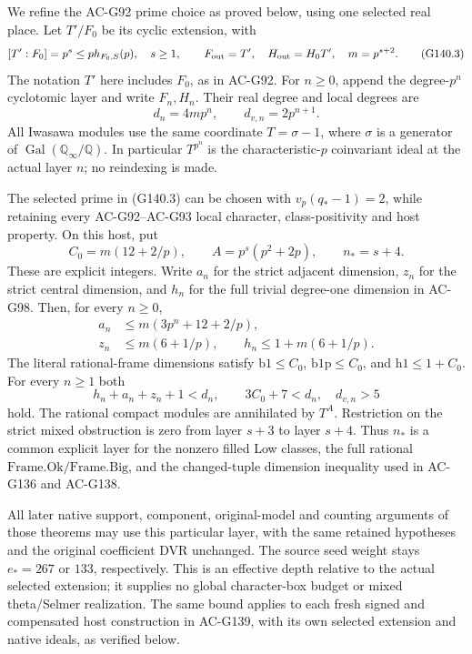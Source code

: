 We refine the AC-G92 prime choice as proved below, using one selected
real place.  Let $T'/F_0$ be its cyclic extension, with
\[
 [T':F_0]=p^s\le p h_{F_0,S}(p),\quad s\ge1,\qquad
 F_{\rm out}=T',\quad H_{\rm out}=H_0T',\quad m=p^{s+2}.
 \tag{G140.3}
\]
The notation $T'$ here includes $F_0$, as in AC-G92.
For $n\ge0$, append the degree-$p^n$ cyclotomic layer and write
$F_n,H_n$.  Their real degree and local degrees are
\[
 d_n=4mp^n,\qquad d_{v,n}=2p^{n+1}.
 \tag{G140.4}
\]
All Iwasawa modules use the same coordinate $T=\sigma-1$, where
$\sigma$ is a generator of $\operatorname{Gal}(\mathbb Q_\infty/
\mathbb Q)$.  In particular $T^{p^n}$ is the characteristic-$p$
coinvariant ideal at the actual layer $n$; no reindexing is made.

\begin{theorem}
\label{AC-G140}
The selected prime in (G140.3) can be chosen with
$v_p(q_*-1)=2$, while retaining every AC-G92--AC-G93 local character,
class-positivity and host property.  On this host, put
\[
 C_0=m(12+2/p),\qquad A=p^s(p^2+2p),\qquad n_*=s+4.
 \tag{G140.5}
\]
These are explicit integers.  Write $a_n$ for the strict adjacent
dimension, $z_n$ for the strict central dimension, and $h_n$ for the
full trivial degree-one dimension in AC-G98.  Then, for every $n\ge0$,
\[
 \begin{split}
 a_n&\le m(3p^n+12+2/p),\\
 z_n&\le m(6+1/p),\qquad h_n\le1+m(6+1/p).
 \end{split} \tag{G140.6}
\]
The literal rational-frame dimensions satisfy
$\mathrm{b1}\le C_0$, $\mathrm{b1p}\le C_0$, and
$\mathrm{h1}\le1+C_0$.  For every $n\ge1$ both
\[
 h_n+a_n+z_n+1<d_n,\qquad
 3C_0+7<d_n,\quad d_{v,n}>5
 \tag{G140.7}
\]
hold.  The rational compact modules are annihilated by $T^A$.
Restriction on the strict mixed obstruction is zero from layer
$s+3$ to layer $s+4$.  Thus $n_*$ is a common explicit layer for
the nonzero filled Low classes, the full rational
$\mathrm{Frame.Ok}/\mathrm{Frame.Big}$, and the changed-tuple
dimension inequality used in AC-G136 and AC-G138.

All later native support, component, original-model and counting
arguments of those theorems may use this particular layer, with
the same retained hypotheses and the original coefficient DVR
unchanged.  The source seed weight stays $e_*=267$ or $133$,
respectively.  This is an effective depth relative to the actual
selected extension; it supplies no global character-box budget or
mixed theta/Selmer realization.
The same bound applies to each fresh signed and compensated host
construction in AC-G139, with its own selected extension and native
ideals, as verified below.
\end{theorem}

